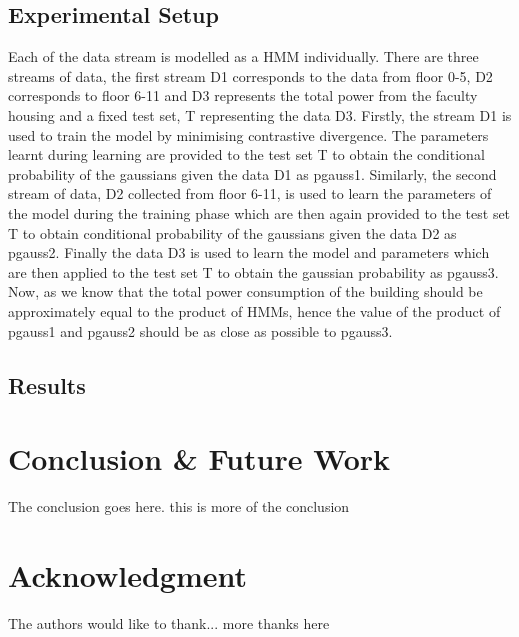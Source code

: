\documentclass[10pt, conference, compsocconf]{IEEEtran}
\begin{document}
\subsection{ Experimental Setup } 
Each of the data stream is modelled as a HMM individually. There are three streams of data, the first stream D1 corresponds to the data from floor 0-5, D2 corresponds to floor 6-11 and D3 represents the total power from the faculty housing and a fixed test set, T representing the data D3. Firstly, the stream D1 is used to train the model by minimising contrastive divergence. The parameters learnt during learning are provided to the test set T to obtain the conditional probability of the gaussians given the data D1 as pgauss1. Similarly, the second stream of data, D2 collected from floor 6-11, is used to learn the parameters of the model during the training phase which are then again provided to the test set T to obtain conditional probability of the gaussians given the data D2 as pgauss2. Finally the data D3 is used to learn the model and parameters which are then applied to the test set T to obtain the gaussian probability as pgauss3. Now, as we know that the total power consumption of the building should be approximately equal to the product of HMMs, hence the value of the product of pgauss1 and pgauss2 should be as close as possible to pgauss3.

\subsection{ Results }

\section{Conclusion \& Future Work}
The conclusion goes here. this is more of the conclusion



\section*{Acknowledgment}


The authors would like to thank...
more thanks here


\end{document}
